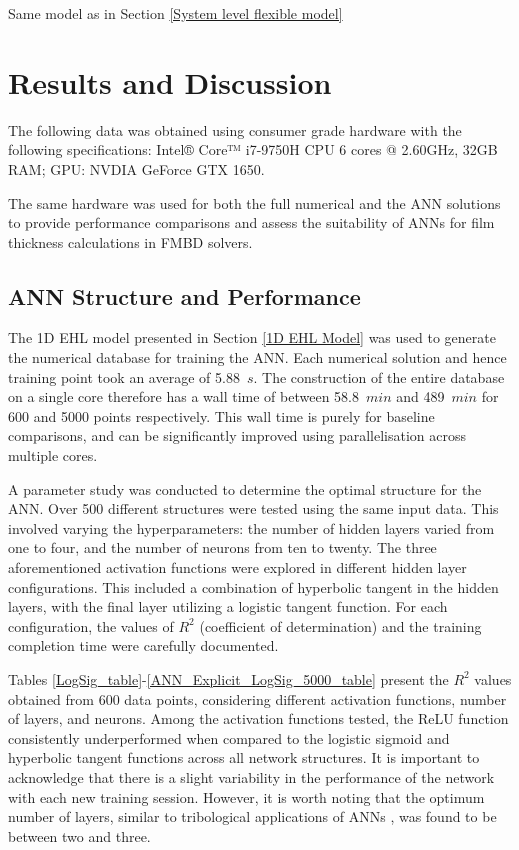 Same model as in Section \ref{System level flexible model}



\section{Results and Discussion}

The following data was obtained using consumer grade hardware with the following specifications: 
Intel® Core™ i7-9750H CPU 6 cores @ 2.60GHz, 32GB RAM; GPU: NVDIA GeForce GTX 1650.

The same hardware was used for both the full numerical and the ANN solutions to provide performance comparisons and assess the suitability of ANNs for film thickness calculations in FMBD solvers.

\subsection{ANN Structure and Performance}

The 1D EHL model presented in Section \ref{1D EHL Model} was used to generate the numerical database for training the ANN. Each numerical solution and hence training point took an average of 5.88~$s$. The construction of the entire database on a single core therefore has a wall time of between 58.8~$min$ and 489~$min$ for 600 and 5000 points respectively. This wall time is purely for baseline comparisons, and can be significantly improved using parallelisation across multiple cores.

A parameter study was conducted to determine the optimal structure for the ANN. Over 500 different structures were tested using the same input data. This involved varying the hyperparameters: the number of hidden layers varied from one to four, and the number of neurons from ten to twenty. The three aforementioned activation functions were explored in different hidden layer configurations. This included a combination of hyperbolic tangent in the hidden layers, with the final layer utilizing a logistic tangent function. For each configuration, the values of $R^2$ (coefficient of determination) and the training completion time were carefully documented.

Tables \ref{LogSig_table}-\ref{ANN_Explicit_LogSig_5000_table} present the $R^2$ values obtained from 600 data points, considering different activation functions, number of layers, and neurons. Among the activation functions tested, the ReLU function consistently underperformed when compared to the logistic sigmoid and hyperbolic tangent functions across all network structures. It is important to acknowledge that there is a slight variability in the performance of the network with each new training session. However, it is worth noting that the optimum number of layers, similar to tribological applications of ANNs \cite{Marian2021}, was found to be between two and three.

